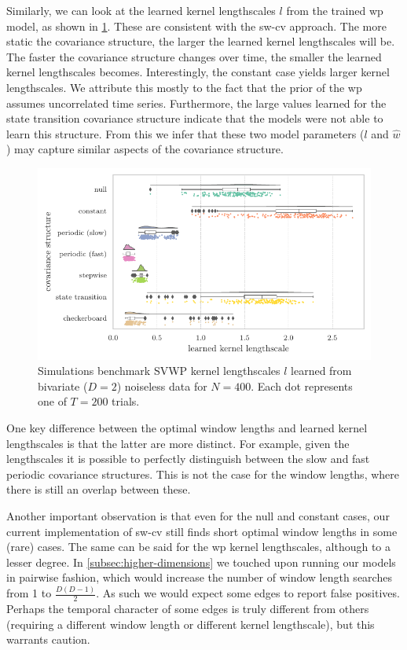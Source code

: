 Similarly, we can look at the learned kernel lengthscales $l$ from the trained \gls{wp} model, as shown in \cref{fig:sim-learned-kernel-lengthscales}.
These are consistent with the \gls{sw-cv} approach.
The more static the covariance structure, the larger the learned kernel lengthscales will be.
The faster the covariance structure changes over time, the smaller the learned kernel lengthscales becomes.
Interestingly, the constant case yields larger kernel lengthscales.
We attribute this mostly to the fact that the prior of the \gls{wp} assumes uncorrelated time series.
Furthermore, the large values learned for the state transition covariance structure indicate that the models were not able to learn this structure.
%
From this we infer that these two model parameters ($l$ and $\hat{w}$) may capture similar aspects of the covariance structure.


\begin{figure}[t]
  \centering
  \includegraphics[width=\textwidth]{fig/sim/d2/N0400_T0200/no_noise/SVWP_kernel_lengthscales}
  \caption{
    Simulations benchmark SVWP kernel lengthscales $l$ learned from bivariate ($D = 2$) noiseless data for $N = 400$.
    Each dot represents one of $T = 200$ trials.
  }
  \label{fig:sim-learned-kernel-lengthscales}
\end{figure}


One key difference between the optimal window lengths and learned kernel lengthscales is that the latter are more distinct.
For example, given the lengthscales it is possible to perfectly distinguish between the slow and fast periodic covariance structures.
This is not the case for the window lengths, where there is still an overlap between these.

Another important observation is that even for the null and constant cases, our current implementation of \gls{sw-cv} still finds short optimal window lengths in some (rare) cases.
The same can be said for the \gls{wp} kernel lengthscales, although to a lesser degree.
In \cref{subsec:higher-dimensions} we touched upon running our models in pairwise fashion, which would increase the number of window length searches from 1 to $\frac{D (D - 1)}{2}$.
As such we would expect some edges to report false positives.
Perhaps the temporal character of some edges is truly different from others (requiring a different window length or different kernel lengthscale), but this warrants caution.


